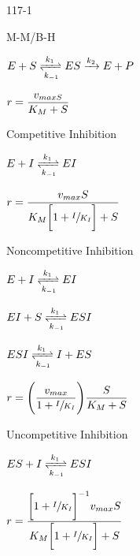 \begin{mitframe}{117-1}
        
\begin{listone}
	\item M-M/B-H 
    
    \begin{listtwo}
		\item  $\energy+\entropy\xrightleftharpoons[\thermcond_{-1}]{\thermcond_1}\energy\entropy\xrightarrow{\thermcond_2}\energy+\p$
    	\item $\pos=\dfrac{\vvel_{max\entropy}}{\dilfac_M+\entropy}$
    \end{listtwo}
    
    \item Competitive Inhibition
    
    \begin{listtwo}
	    \item $\energy+\mominertia\xrightleftharpoons[\thermcond_{-1}]{\thermcond_1}\energy\mominertia$
   		\item $\pos=\dfrac{\vvel_{max}\entropy}{\dilfac_M\bigg[1+\sfrac{\mominertia}{\dilfac_{\mominertia}}\bigg]+\entropy}$
    \end{listtwo}
    
    \item Noncompetitive Inhibition
    
    \begin{listtwo}
		\item $\energy+\mominertia\xrightleftharpoons[\thermcond_{-1}]{\thermcond_1}\energy\mominertia$
   		\item $\energy\mominertia+\entropy\xrightleftharpoons[\thermcond_{-1}]{\thermcond_1}\energy\entropy\mominertia$
   		\item $\energy\entropy\mominertia\xrightleftharpoons[\thermcond_{-1}]{\thermcond_1}\mominertia+\energy\entropy$
    	\item $\pos=\Bigg(\dfrac{\vvel_{max}}{1+\sfrac{\mominertia}{\dilfac_{\mominertia}}}\Bigg)\dfrac{\entropy}{\dilfac_M+\entropy}$
    \end{listtwo}
    
    \item Uncompetitive Inhibition
    
    \begin{listtwo}
	    \item $\energy\entropy+\mominertia\xrightleftharpoons[\thermcond_{-1}]{\thermcond_1}\energy\entropy\mominertia$
 	   \item $\pos=\dfrac{\bigg[1+\sfrac{\mominertia}{\dilfac_{\mominertia}}\bigg]^{-1}\vvel_{max}\entropy}{\dilfac_M\bigg[1+\sfrac{\mominertia}{\dilfac_{\mominertia}}\bigg]+\entropy}$
    \end{listtwo}
    

\end{listone}
\end{mitframe}
